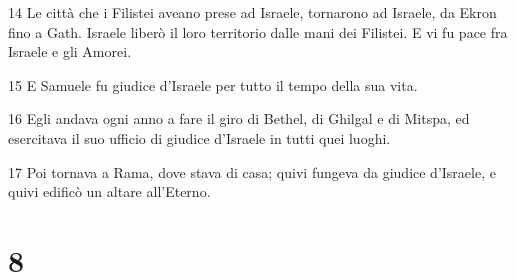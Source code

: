 \par 14 Le città che i Filistei aveano prese ad Israele, tornarono ad Israele, da Ekron fino a Gath. Israele liberò il loro territorio dalle mani dei Filistei. E vi fu pace fra Israele e gli Amorei.
\par 15 E Samuele fu giudice d'Israele per tutto il tempo della sua vita.
\par 16 Egli andava ogni anno a fare il giro di Bethel, di Ghilgal e di Mitspa, ed esercitava il suo ufficio di giudice d'Israele in tutti quei luoghi.
\par 17 Poi tornava a Rama, dove stava di casa; quivi fungeva da giudice d'Israele, e quivi edificò un altare all'Eterno.

\chapter{8}

